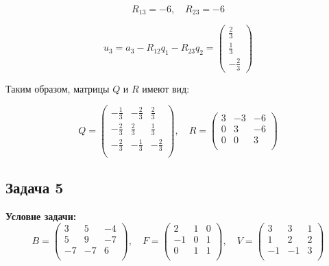 \documentclass[a4paper,12pt]{article}
\begin{document}
\[
R_{13} = -6, \quad R_{23} = -6
\]

\[
u_3 = a_3 - R_{12} q_1 - R_{23} q_2 = \begin{pmatrix}
\frac{2}{3} \\
\frac{1}{3} \\
-\frac{2}{3}
\end{pmatrix}
\]

Таким образом, матрицы $Q$ и $R$ имеют вид:

\[
Q = 
\begin{pmatrix}
-\frac{1}{3} & -\frac{2}{3} & \frac{2}{3} \\
-\frac{2}{3} & \frac{2}{3} & \frac{1}{3} \\
-\frac{2}{3} & -\frac{1}{3} & -\frac{2}{3} \\
\end{pmatrix}, \quad
R = 
\begin{pmatrix}
3 & -3 & -6 \\
0 & 3 & -6 \\
0 & 0 & 3 \\
\end{pmatrix}
\]

\vspace{1cm}

\subsection{Задача 5}
\textbf{Условие задачи:}
\[
B = \begin{pmatrix}
3 & 5 & -4 \\
5 & 9 & -7 \\
-7 & -7 & 6 \\
\end{pmatrix}, \quad
F = \begin{pmatrix}
2 & 1 & 0 \\
-1 & 0 & 1 \\
0 & 1 & 1 \\
\end{pmatrix}, \quad
V = \begin{pmatrix}
3 & 3 & 1 \\
1 & 2 & 2 \\
-1 & -1 & 3 \\
\end{pmatrix}
\]
\end{document}
